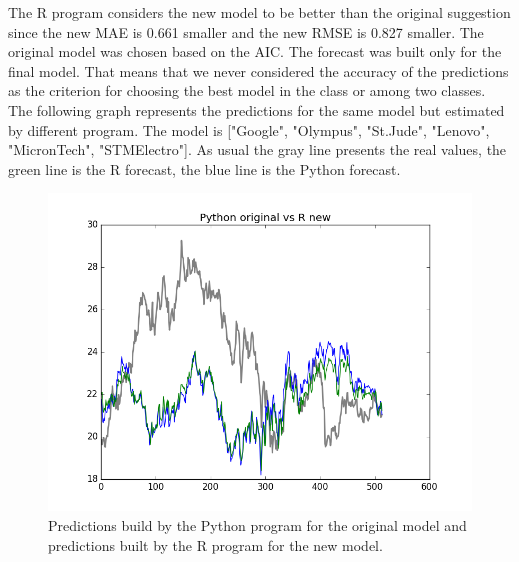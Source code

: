 \documentclass[
  twoside,
  11pt, a4paper,
  footinclude=true,
  headinclude=true,
  cleardoublepage=empty
]{scrreprt}
\begin{document}
    The R program considers the new model to be better than the original suggestion since the new MAE is 0.661 smaller and the new RMSE is 0.827 smaller. The original model was chosen based on the AIC. The forecast was built only for the final model. That means that we never considered the accuracy of the predictions as the criterion for choosing the best model in the class or among two classes.\\
    The following graph represents the predictions for the same model but estimated by different program. The model is ["Google", "Olympus", "St.Jude", "Lenovo", "MicronTech", "STMElectro"]. As usual the gray line presents the real values, the green line is the R forecast, the blue line is the Python forecast.
    
    \begin{figure}[h]
        \includegraphics[scale=0.5]{img_examples/PythonOriginalVsRNew.png}
        \centering
        \caption{Predictions build by the Python program for the original model and predictions built by the R program for the new model.}
        \label{fig:PythonOriginalVsRNew}
    \end{figure}
\end{document}
